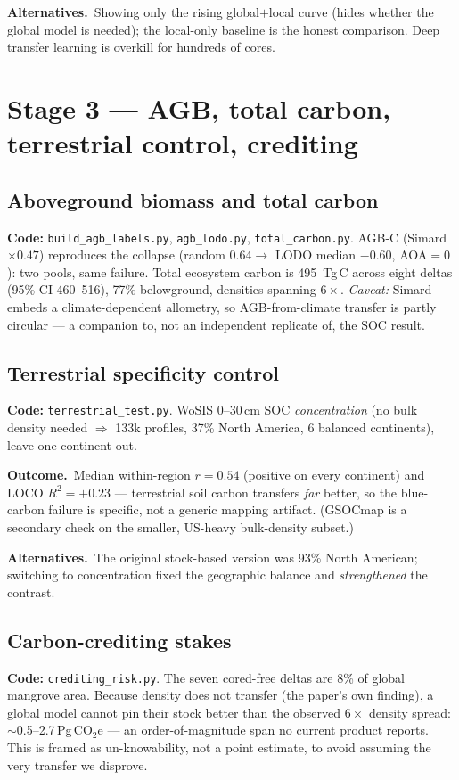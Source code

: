 \documentclass[11pt]{article}
\newcommand{\file}[1]{\texttt{\small #1}}
\newcommand{\out}{\textbf{\color{nb}Outcome.}\ }
\newcommand{\alt}{\textbf{\color{nb}Alternatives.}\ }
\begin{document}
\alt Showing only the rising global$+$local curve (hides whether the global model is needed);
the local-only baseline is the honest comparison. Deep transfer learning is overkill for
hundreds of cores.

\section{Stage 3 --- AGB, total carbon, terrestrial control, crediting}
\subsection{Aboveground biomass and total carbon}
\textbf{Code:} \file{build\_agb\_labels.py}, \file{agb\_lodo.py}, \file{total\_carbon.py}.
AGB-C (Simard$\times0.47$) reproduces the collapse (random $0.64\to$ LODO median $-0.60$,
AOA$=0$): two pools, same failure. Total ecosystem carbon is \SI{495}{\tera\gram}\,C across
eight deltas (95\% CI 460--516), 77\% belowground, densities spanning $6\times$.
\emph{Caveat:} Simard embeds a climate-dependent allometry, so AGB-from-climate transfer is
partly circular --- a companion to, not an independent replicate of, the SOC result.

\subsection{Terrestrial specificity control}
\textbf{Code:} \file{terrestrial\_test.py}. WoSIS 0--30\,cm SOC \emph{concentration} (no bulk
density needed $\Rightarrow$ 133k profiles, 37\% North America, 6 balanced continents),
leave-one-continent-out.

\out Median within-region $r=0.54$ (positive on every continent) and LOCO $R^2=+0.23$ ---
terrestrial soil carbon transfers \emph{far} better, so the blue-carbon failure is specific,
not a generic mapping artifact. (GSOCmap is a secondary check on the smaller, US-heavy
bulk-density subset.)

\alt The original stock-based version was 93\% North American; switching to concentration
fixed the geographic balance and \emph{strengthened} the contrast.

\subsection{Carbon-crediting stakes}
\textbf{Code:} \file{crediting\_risk.py}. The seven cored-free deltas are 8\% of global
mangrove area. Because density does not transfer (the paper's own finding), a global model
cannot pin their stock better than the observed $6\times$ density spread:
$\sim$0.5--2.7\,\si{\peta\gram}\,CO$_2$e --- an order-of-magnitude span no current product
reports. This is framed as un-knowability, not a point estimate, to avoid assuming the very
transfer we disprove.
\end{document}
